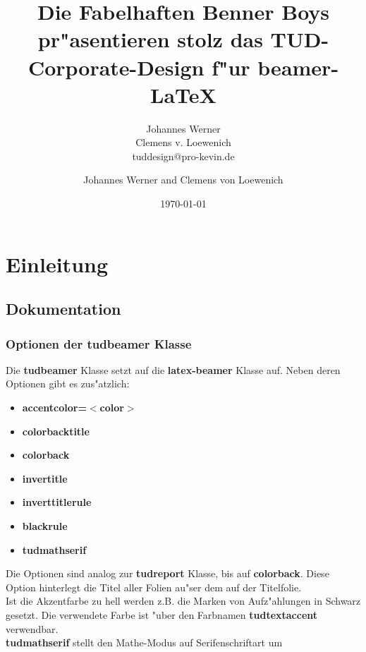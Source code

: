\documentclass[accentcolor=tud1a,colorbacktitle,inverttitle,landscape,german,presentation,t]{tudbeamer}
\begin{document}
\title[Fabelhafte Benner Boys]{Die Fabelhaften Benner Boys pr"asentieren
stolz das TUD-Corporate-Design f"ur beamer-\LaTeX}
\subtitle{Johannes Werner\\Clemens v. Loewenich\\tuddesign@pro-kevin.de}

\author[J. Werner et al.]{Johannes Werner and Clemens von Loewenich}


\date{\today}

\begin{titleframe}
\end{titleframe}

\section{Einleitung}
	
	\subsection{Dokumentation}
		\begin{frame}
		  \frametitle{Optionen der \textbf{tudbeamer} Klasse}
			Die \textbf{tudbeamer} Klasse setzt auf die
			\textbf{latex-beamer} Klasse auf. Neben deren
			Optionen gibt es zus"atzlich:
		  \begin{itemize}
			\item \textbf{accentcolor=$<$color$>$}
			\item \textbf{colorbacktitle}
			\item \textbf{colorback}
			\item \textbf{invertitle}
			\item \textbf{inverttitlerule}
			\item \textbf{blackrule}
			\item \textbf{tudmathserif}
		  \end{itemize}
			Die Optionen sind analog zur \textbf{tudreport} Klasse, bis auf \textbf{colorback}. 
			Diese Option hinterlegt die Titel aller Folien au"ser dem auf der Titelfolie.\\
			\vfill
			Ist die Akzentfarbe zu hell werden z.B. die Marken von
			Aufz"ahlungen in Schwarz gesetzt. Die verwendete
			Farbe ist "uber den Farbnamen \alert{\bf tudtextaccent}
			verwendbar.\\
			\vfill
			\textbf{tudmathserif} stellt den Mathe-Modus auf Serifenschriftart um
		\end{frame}
\end{document}
